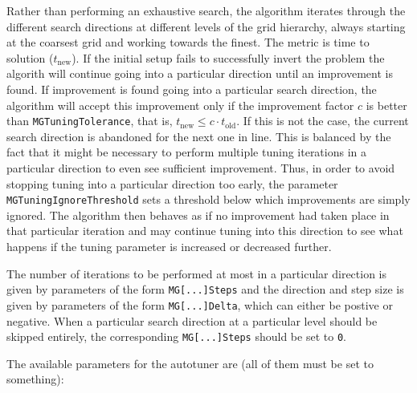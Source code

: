Rather than performing an exhaustive search, the algorithm iterates through the different search directions at different levels of the grid hierarchy, always starting at the coarsest grid and working towards the finest.
The metric is time to solution ($t_\mathrm{new}$). 
If the initial setup fails to successfully invert the problem the algorith will continue going into a particular direction until an improvement is found.
If improvement is found going into a particular search direction, the algorithm will accept this improvement only if the improvement factor $c$ is better than \texttt{MGTuningTolerance}, that is, $t_\mathrm{new} \leq c \cdot t_\mathrm{old}$.
If this is not the case, the current search direction is abandoned for the next one in line.
This is balanced by the fact that it might be necessary to perform multiple tuning iterations in a particular direction to even see sufficient improvement.
Thus, in order to avoid stopping tuning into a particular direction too early, the parameter \texttt{MGTuningIgnoreThreshold} sets a threshold below which improvements are simply ignored.
The algorithm then behaves as if no improvement had taken place in that particular iteration and may continue tuning into this direction to see what happens if the tuning parameter is increased or decreased further.

The number of iterations to be performed at most in a particular direction is given by parameters of the form \texttt{MG[...]Steps} and the direction and step size is given by parameters of the form \texttt{MG[...]Delta}, which can either be postive or negative.
When a particular search direction at a particular level should be skipped entirely, the corresponding \texttt{MG[...]Steps} should be set to \texttt{0}.

The available parameters for the autotuner are (all of them must be set to something):

